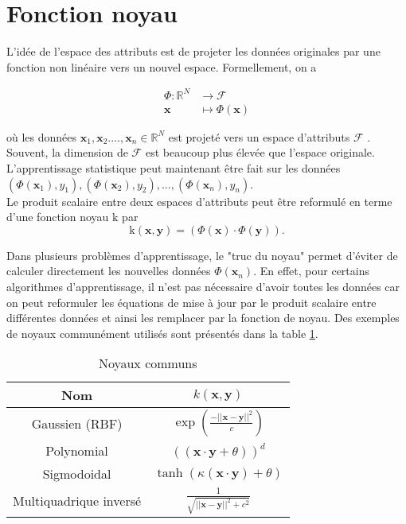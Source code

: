 \section{Fonction noyau}\label{sec:kernel}

L'idée de l'espace des attributs est de projeter les données originales par une fonction non linéaire vers un nouvel espace. Formellement, on a 

\begin{align*}
\Phi : \mathbb{R}^N &\to \mathcal{F} \\
\textbf{x} &\mapsto \Phi(\textbf{x})
\end{align*}

où les données $\textbf{x}_1, \textbf{x}_2. \dots, \textbf{x}_n \in \mathbb{R}^N$ est projeté vers un espace d'attributs $\mathcal{F}$ \cite{muller2001introduction}. Souvent, la dimension de $\mathcal{F}$ est beaucoup plus élevée que l'espace originale. L'apprentissage statistique peut maintenant être fait sur les données $(\Phi(\textbf{x}_1), y_1), (\Phi(\textbf{x}_2), y_2), \dots, (\Phi(\textbf{x}_n), y_n)$. \\

Le produit scalaire entre deux espaces d'attributs peut être reformulé en terme d'une fonction noyau $\textrm{k}$ par
$$\textrm{k}(\textbf{x}, \textbf{y}) = (\Phi(\textbf{x})\cdot \Phi(\textbf{y})).$$

Dans plusieurs problèmes d'apprentissage, le "truc du noyau" permet d'éviter de calculer directement les nouvelles données $\Phi(\textbf{x}_n)$. En effet, pour certains algorithmes d'apprentissage, il n'est pas nécessaire d'avoir toutes les données car on peut reformuler les équations de mise à jour par le produit scalaire entre différentes données et ainsi les remplacer par la fonction de noyau. Des exemples de noyaux communément utilisés sont présentés dans la table \ref{tab:kernels}.

\begin{table}[H]
	\centering
\begin{tabular}{|c|c|}
	\hline
	         Nom           &                  $k(\textbf{x}, \textbf{y})$                  \\ \hline
	    Gaussien (RBF)     & $\exp \left(\frac{-|| \textbf{x} - \textbf{y}||^2}{c}\right)$ \\ \hline
	      Polynomial       &         $((\textbf{x} \cdot \textbf{y} + \theta))^d$          \\ \hline
	     Sigmodoidal       &    $\tanh (\kappa (\textbf{x} \cdot \textbf{y}) + \theta)$    \\ \hline
	Multiquadrique inversé &     $\frac{1}{\sqrt{||\textbf{x}-\textbf{y}||^2 + c^2}}$      \\ \hline
\end{tabular} 
\caption{Noyaux communs}
\label{tab:kernels}
\end{table}
